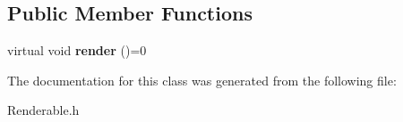 \subsection*{Public Member Functions}
\begin{DoxyCompactItemize}
\item 
virtual void {\bfseries render} ()=0\hypertarget{classRenderable_a7d02709d871bd2bde97d41d933df5adf}{}\label{classRenderable_a7d02709d871bd2bde97d41d933df5adf}

\end{DoxyCompactItemize}


The documentation for this class was generated from the following file\+:\begin{DoxyCompactItemize}
\item 
Renderable.\+h\end{DoxyCompactItemize}
